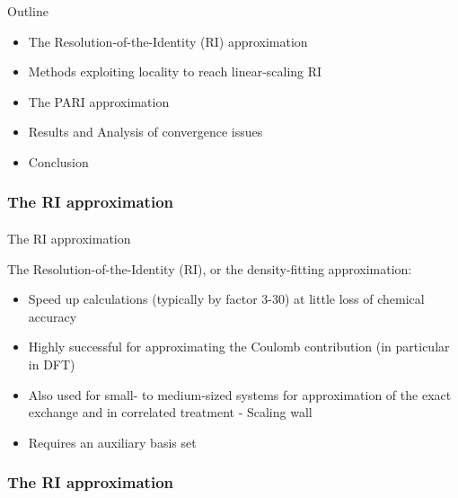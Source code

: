 \begin{frame}{Outline}
\footnotesize

\begin{itemize}
\item The Resolution-of-the-Identity (RI) approximation
\item Methods exploiting locality to reach linear-scaling RI
\item The PARI approximation
\item Results and Analysis of convergence issues
\item Conclusion
\end{itemize}

\end{frame}
\frametitle{The RI approximation}
\framesubtitle{}

\begin{frame}{The RI approximation}
\footnotesize

 The Resolution-of-the-Identity (RI), or the {\blue density-fitting} approximation:
\begin{itemize}
  \item Speed up calculations ({\blue typically by factor 3-30}) at little loss of chemical accuracy
  \item Highly successful for {\blue approximating the Coulomb contribution} (in particular in DFT)
  \item Also used for small- to medium-sized systems for {\blue approximation of the exact exchange} and 
        in correlated treatment - {\red Scaling wall}
  \item {\red Requires an auxiliary basis set}
\end{itemize}

\end{frame}

\frametitle{The RI approximation}
\framesubtitle{}

